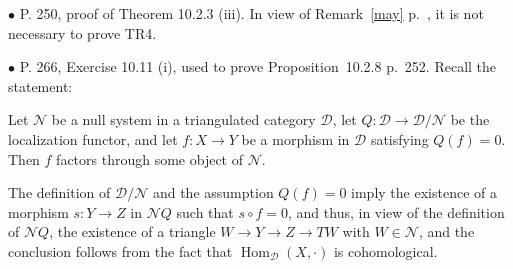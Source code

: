 \documentclass[12pt]{article}
\theoremstyle{remark}
\newcommand{\bu}{\bullet}
\newcommand{\n}{\noindent}
\newcommand{\cc}{\mathcal}
\newcommand{\pr}{Proposition}
\DeclareMathOperator{\h}{Hom}
\begin{document}

\n$\bu$ P. 250, proof of Theorem 10.2.3 (iii). In view of Remark~\ref{may} p.~\pageref{may}, it is not necessary to prove TR4. 


\n$\bu$ P. 266, Exercise 10.11 (i), used to prove \pr\ 10.2.8 p.~252. Recall the statement: 

Let $\cc N$ be a null system in a triangulated category $\cc D$, let $Q:\cc D\to\cc D/\cc N$ be the localization functor, and let $f:X\to Y$ be a morphism in $\cc D$ satisfying $Q(f)=0$. Then $f$ factors through some object of $\cc N$. 

\n{\em Proof.} The definition of $\cc D/\cc N$ and the assumption $Q(f)=0$ imply the existence of a morphism $s:Y\to Z$ in $\cc NQ$ such that $s\circ f=0$, and thus, in view of the definition of $\cc NQ$, the existence of a triangle $W\to Y\to Z\to TW$ with $W\in\cc N$, and the conclusion follows from the fact that $\h_{\cc D}(X,\cdot)$ is cohomological. 
% 
\end{document}

